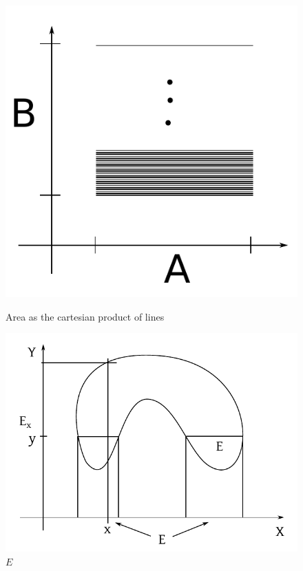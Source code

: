 \documentclass{article}
\begin{document}
\begin{figure}[!h]
  \begin{center}
    \includegraphics{img/20_area.pdf}
    \caption{Area as the cartesian product of lines}
    \label{img:area}
  \end{center}
  \begin{center}
    \includegraphics{img/20_5_sections.pdf}
    \caption{$E$}
    \label{img:205}
  \end{center}
\end{figure}
\end{document}
